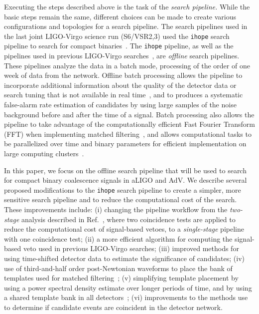\documentclass[12pt]{iopart} \usepackage{graphicx,amssymb}
\begin{document}
Executing the steps described above is the task of the \emph{search pipeline.}
While the basic steps remain the same, different choices can be made to
create various configurations and topologies for a search pipeline. The search
pipelines used in the last joint LIGO-Virgo science run (S6/VSR2,3) used the
\texttt{ihope} search pipeline to search for compact
binaries~\cite{Babak:2012zx}. The \texttt{ihope} pipeline, as well as the
pipelines used in previous LIGO-Virgo
searches~\cite{Brown:2004pv,Brown:2005zs}, are \emph{offline} search
pipelines. These pipelines analyze the data in a batch mode, processing
of the order of one week of data from the network. Offline batch
processing allows the pipeline to incorporate additional information about the
quality of the detector data or search tuning that is not available in real
time~\cite{Aasi:2012wd,Aasi:2014mqd}, and to produces a systematic false-alarm rate
estimation of candidates by using large samples of the noise background before
and after the time of a signal. Batch processing also allows the pipeline to
take advantage of the computationally efficient Fast Fourier Transform (FFT)
when implementing matched filtering~\cite{Allen:2005fk}, and allows
computational tasks to be parallelized over time and binary parameters for
efficient implementation on large computing clusters~\cite{Brown:workflow}.

In this paper, we focus on the offline search pipeline that will be used to 
search for compact binary coalescence signals in aLIGO and AdV.  We describe 
several proposed modifications
to the \texttt{ihope} search pipeline to create a simpler, more sensitive
search pipeline and to reduce the computational cost of the search. These
improvements include: (i) changing the pipeline workflow from the
\emph{two-stage} analysis described in Ref.~\cite{Babak:2012zx}, where two
coincidence tests are applied to reduce the computational cost of signal-based
vetoes, to a \emph{single-stage} pipeline with one coincidence test; (ii) a 
more efficient algorithm for computing the signal-based veto
used in previous LIGO-Virgo searches; (iii) improved methods for using
time-shifted detector data to estimate the significance of candidates; (iv) use
of third-and-half order post-Newtonian waveforms to place the bank of templates
used for matched filtering~\cite{Keppel:2013kia}; (v) simplifying template 
placement by using a power
spectral density estimate over longer periods of time, and by using a shared
template bank in all detectors~\cite{Keppel:2013uma}; (vi) improvements to the methods use to
determine if candidate events are coincident in the detector network. 
\end{document}
